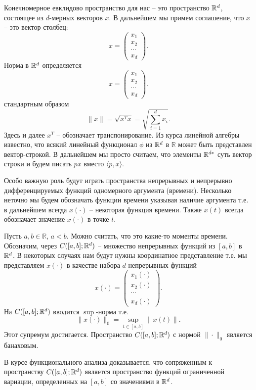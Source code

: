 \documentclass[a4paper,12pt]{report}
\begin{document}
Конечномерное евклидово пространство для нас -- это пространство $\mathbb{R}^d$, состоящее из $d$-мерных векторов $x$. В дальнейшем мы примем соглашение, что $x$ -- это вектор столбец:
$$x=\left(\begin{array}{c}
x_1 \\ x_2 \\ \cdots \\ x_d
\end{array}\right). $$
Норма в $\mathbb{R}^d$ определяется$$x=\left(\begin{array}{c}
x_1 \\ x_2 \\ \cdots \\ x_d
\end{array}\right). $$ стандартным образом $$\|x\|=\sqrt{x^T x}=\sqrt{\sum_{i=1}^d x_i}.$$ Здесь и далее $x^T$ -- обозначает транспонирование. Из курса линейной алгебры известно, что всякий линейный функционал $\phi$ из $\mathbb{R}^d$ в $\mathbb{R}$ может быть представлен вектор-строкой. В дальнейшем мы просто считаем, что элементы $\mathbb{R}^{d*}$ суть вектор строки и будем писать $px$ вместо $\langle p,x\rangle$. 

Особо важную роль будут играть пространства непрерывных и непрерывно дифференцируемых функций одномерного аргумента (времени). Несколько неточно мы будем обозначать функции времени указывая наличие аргумента т.е. в дальнейшем всегда $x(\cdot)$ -- некоторая функция времени. Также $x(t)$ всегда обозначает значение $x(\cdot)$ в точке $t$. 

Пусть $a,b\in \mathbb{R}$, $a<b$. Можно считать, что это какие-то моменты времени. Обозначим, через $C([a,b];\mathbb{R}^d)$ -- множество непрерывных функций из $[a,b]$ в $\mathbb{R}^d$. В некоторых случаях нам будут нужны координатное представление т.е. мы представляем $x(\cdot)$ в качестве набора $d$ непрерывных функций
$$x(\cdot)=\left(\begin{array}{c}
x_1(\cdot) \\ x_2(\cdot) \\ \cdots \\ x_d(\cdot)
\end{array}\right). $$ На $C([a,b];\mathbb{R}^d)$ вводится $\sup$-норма т.е. $$\|x(\cdot)\|_0=\sup_{t\in [a,b]}\|x(t)\|.$$ Этот супремум достигается. Пространство $C([a,b];\mathbb{R}^d)$ с нормой $\|\cdot\|_0$ является банаховым.

В курсе функционального анализа доказывается, что сопряженным к пространству $C([a,b];\mathbb{R}^d)$ является пространство функций ограниченной вариации, определенных на $[a,b]$ со значениями в $\mathbb{R}^d$. 
\end{document}
